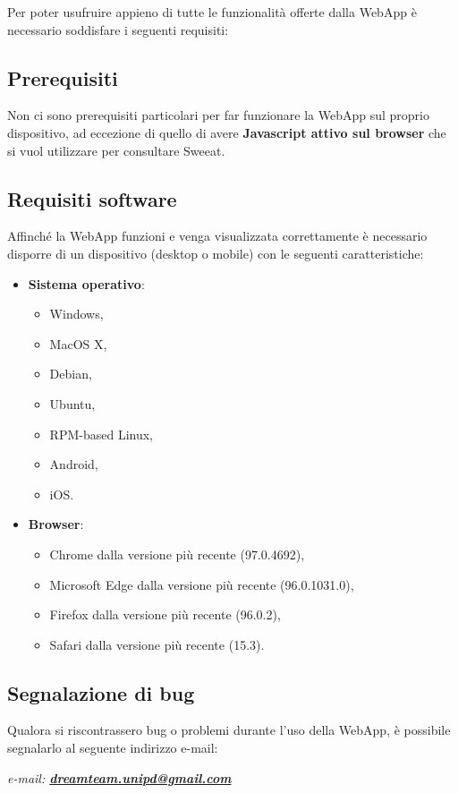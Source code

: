 
Per poter usufruire appieno di tutte le funzionalità offerte dalla WebApp è necessario soddisfare i seguenti requisiti:

\subsection{Prerequisiti}

Non ci sono prerequisiti particolari per far funzionare la WebApp sul proprio dispositivo, ad eccezione di quello di avere \textbf{Javascript attivo sul browser} che si vuol utilizzare per consultare Sweeat.

\subsection{Requisiti software}

Affinché la WebApp funzioni e venga visualizzata correttamente è necessario disporre di un dispositivo (desktop o mobile) con le seguenti caratteristiche:

\begin{itemize}
\item \textbf{Sistema operativo}: 
\begin{itemize}
	\item Windows, 
	\item MacOS X, 
	\item Debian, 
	\item Ubuntu, 
	\item RPM-based Linux, 
	\item Android, 
	\item iOS.
\end{itemize}
\item \textbf{Browser}:
\begin{itemize} 
	\item Chrome dalla versione più recente (97.0.4692),
	\item Microsoft Edge dalla versione più recente (96.0.1031.0),
	\item Firefox dalla versione più recente (96.0.2),
	\item Safari dalla versione più recente (15.3).
\end{itemize}
\end{itemize}

\subsection{Segnalazione di bug}

Qualora si riscontrassero bug o problemi durante l’uso della WebApp, è possibile segnalarlo al seguente indirizzo e-mail: \\
\begin{center}
\textsl{ e-mail: \href{mailto:dreamteam.unipd@gmail.com}{\textbf{dreamteam.unipd@gmail.com}} }
\end{center}
